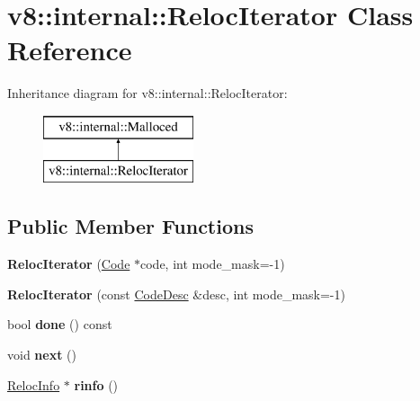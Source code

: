 \hypertarget{classv8_1_1internal_1_1_reloc_iterator}{}\section{v8\+:\+:internal\+:\+:Reloc\+Iterator Class Reference}
\label{classv8_1_1internal_1_1_reloc_iterator}
Inheritance diagram for v8\+:\+:internal\+:\+:Reloc\+Iterator\+:\begin{figure}[H]
\begin{center}
\leavevmode
\includegraphics[height=2.000000cm]{classv8_1_1internal_1_1_reloc_iterator}
\end{center}
\end{figure}
\subsection*{Public Member Functions}
\begin{DoxyCompactItemize}
\item 
{\bfseries Reloc\+Iterator} (\hyperlink{classv8_1_1internal_1_1_code}{Code} $\ast$code, int mode\+\_\+mask=-\/1)\hypertarget{classv8_1_1internal_1_1_reloc_iterator_a43dacabd78f52d3771f87d0f7d268766}{}\label{classv8_1_1internal_1_1_reloc_iterator_a43dacabd78f52d3771f87d0f7d268766}

\item 
{\bfseries Reloc\+Iterator} (const \hyperlink{structv8_1_1internal_1_1_code_desc}{Code\+Desc} \&desc, int mode\+\_\+mask=-\/1)\hypertarget{classv8_1_1internal_1_1_reloc_iterator_a861840bc6a67d6ca50beea9638133f70}{}\label{classv8_1_1internal_1_1_reloc_iterator_a861840bc6a67d6ca50beea9638133f70}

\item 
bool {\bfseries done} () const \hypertarget{classv8_1_1internal_1_1_reloc_iterator_afcee762df16f523a929920cf56735cb0}{}\label{classv8_1_1internal_1_1_reloc_iterator_afcee762df16f523a929920cf56735cb0}

\item 
void {\bfseries next} ()\hypertarget{classv8_1_1internal_1_1_reloc_iterator_a92fcd0e86152eb3899352f7766b8bc05}{}\label{classv8_1_1internal_1_1_reloc_iterator_a92fcd0e86152eb3899352f7766b8bc05}

\item 
\hyperlink{classv8_1_1internal_1_1_reloc_info}{Reloc\+Info} $\ast$ {\bfseries rinfo} ()\hypertarget{classv8_1_1internal_1_1_reloc_iterator_ac53f8a0cca6a7cc37f667295dfda7aea}{}\label{classv8_1_1internal_1_1_reloc_iterator_ac53f8a0cca6a7cc37f667295dfda7aea}

\end{DoxyCompactItemize}
